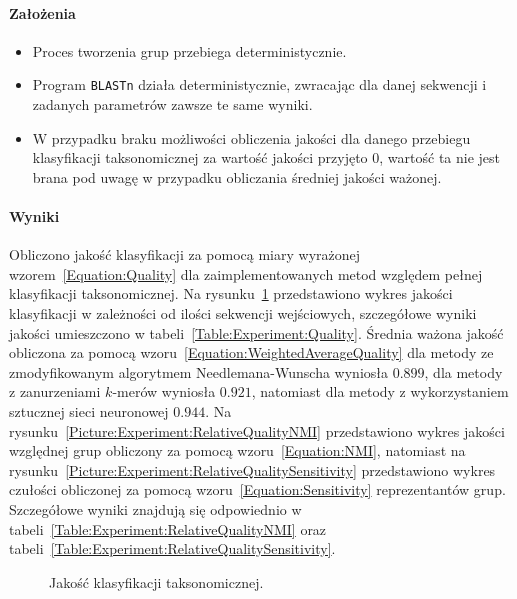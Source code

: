             \paragraph{Założenia}

                \begin{itemize}
                    \item {
                        Proces tworzenia grup przebiega deterministycznie.
                    }
                    \item {
                        Program \texttt{BLASTn} działa deterministycznie, zwracając dla danej sekwencji i zadanych parametrów zawsze te same wyniki.
                    }
                    \item {
                        W przypadku braku możliwości obliczenia jakości dla danego przebiegu klasyfikacji taksonomicznej za wartość jakości przyjęto $0$, wartość ta nie jest brana pod uwagę w przypadku obliczania średniej jakości ważonej.
                    }
                \end{itemize}

            \paragraph{Wyniki}
                Obliczono jakość klasyfikacji za pomocą miary wyrażonej wzorem~\ref{Equation:Quality} dla zaimplementowanych metod względem pełnej klasyfikacji taksonomicznej. Na rysunku~\ref{Picture:Experiment:Quality} przedstawiono wykres jakości klasyfikacji w zależności od ilości sekwencji wejściowych, szczegółowe wyniki jakości umieszczono w tabeli~\ref{Table:Experiment:Quality}. Średnia ważona jakość obliczona za pomocą wzoru~\ref{Equation:WeightedAverageQuality} dla metody ze zmodyfikowanym algorytmem Needlemana-Wunscha wyniosła $0.899$, dla metody z zanurzeniami $k$-merów wyniosła $0.921$, natomiast dla metody z wykorzystaniem sztucznej sieci neuronowej $0.944$. Na rysunku~\ref{Picture:Experiment:RelativeQualityNMI} przedstawiono wykres jakości względnej grup obliczony za pomocą wzoru~\ref{Equation:NMI}, natomiast na rysunku~\ref{Picture:Experiment:RelativeQualitySensitivity} przedstawiono wykres czułości obliczonej za pomocą wzoru~\ref{Equation:Sensitivity} reprezentantów grup. Szczegółowe wyniki znajdują się odpowiednio w tabeli~\ref{Table:Experiment:RelativeQualityNMI} oraz tabeli~\ref{Table:Experiment:RelativeQualitySensitivity}.

                \begin{figure}
                    \begin{center}
                        
                    \end{center}
                    \caption{
                        Jakość klasyfikacji taksonomicznej.
                    }\label{Picture:Experiment:Quality}
                \end{figure}

